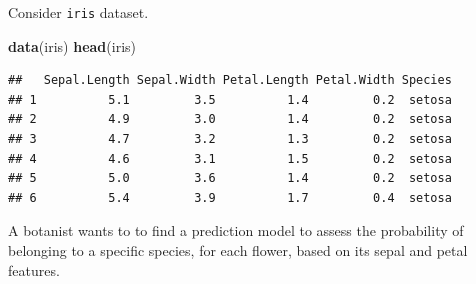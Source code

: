 \documentclass[]{book}
\newenvironment{Shaded}{\begin{snugshade}}{\end{snugshade}}
\newcommand{\KeywordTok}[1]{\textcolor[rgb]{0.13,0.29,0.53}{\textbf{{#1}}}}
\newcommand{\NormalTok}[1]{{#1}}
\begin{document}
Consider \texttt{iris} dataset.

\begin{Shaded}
\begin{Highlighting}[]
\KeywordTok{data}\NormalTok{(iris)}
\KeywordTok{head}\NormalTok{(iris)}
\end{Highlighting}
\end{Shaded}

\begin{verbatim}
##   Sepal.Length Sepal.Width Petal.Length Petal.Width Species
## 1          5.1         3.5          1.4         0.2  setosa
## 2          4.9         3.0          1.4         0.2  setosa
## 3          4.7         3.2          1.3         0.2  setosa
## 4          4.6         3.1          1.5         0.2  setosa
## 5          5.0         3.6          1.4         0.2  setosa
## 6          5.4         3.9          1.7         0.4  setosa
\end{verbatim}

A botanist wants to to find a prediction model to assess the probability
of belonging to a specific species, for each flower, based on its sepal
and petal features.
\end{document}
